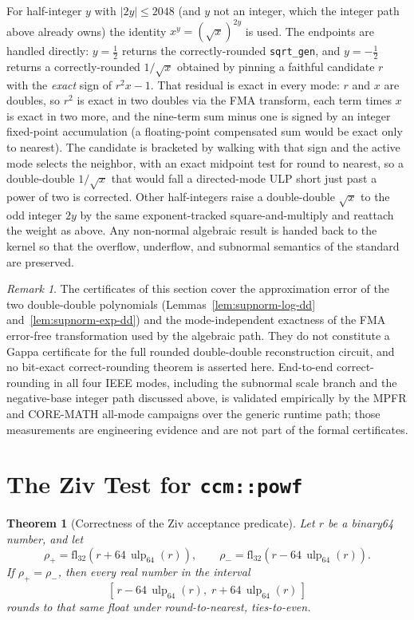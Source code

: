 \documentclass[11pt]{article}
\theoremstyle{plain}
\newtheorem{theorem}{Theorem}
\theoremstyle{remark}
\newtheorem{remark}{Remark}
\newcommand{\ulp}{\operatorname{ulp}}
\newcommand{\Powf}{\texttt{ccm::powf}}
\begin{document}
For half-integer $y$ with $|2y| \le 2048$ (and $y$ not an integer, which the
integer path above already owns) the identity $x^{y} = (\sqrt{x})^{2y}$ is used.
The endpoints are handled directly: $y = \tfrac12$ returns the correctly-rounded
\texttt{sqrt\_gen}, and $y = -\tfrac12$ returns a correctly-rounded $1/\sqrt{x}$
obtained by pinning a faithful candidate $r$ with the \emph{exact} sign of
$r^2 x - 1$.  That residual is exact in every mode: $r$ and $x$ are doubles, so
$r^2$ is exact in two doubles via the FMA transform, each term times $x$ is exact
in two more, and the nine-term sum minus one is signed by an integer
fixed-point accumulation (a floating-point compensated sum would be exact only to
nearest).  The candidate is bracketed by walking with that sign and the active
mode selects the neighbor, with an exact midpoint test for round to nearest, so a
double-double $1/\sqrt{x}$ that would fall a directed-mode ULP short just past a
power of two is corrected.  Other half-integers raise a double-double $\sqrt{x}$
to the odd integer $2y$ by the same exponent-tracked square-and-multiply and
reattach the weight as above.  Any non-normal algebraic result is handed back to
the kernel so that the overflow, underflow, and subnormal semantics of the
standard are preserved.

\begin{remark}
\label{rem:pow-accurate-scope}
The certificates of this section cover the approximation error of the two
double-double polynomials (Lemmas~\ref{lem:supnorm-log-dd}
and~\ref{lem:supnorm-exp-dd}) and the mode-independent exactness of the FMA
error-free transformation used by the algebraic path.  They do not constitute a
Gappa certificate for the full rounded double-double reconstruction circuit, and
no bit-exact correct-rounding theorem is asserted here.  End-to-end
correct-rounding in all four IEEE modes, including the subnormal scale branch and
the negative-base integer path discussed above, is validated empirically by the
MPFR and CORE-MATH all-mode campaigns over the generic runtime path; those
measurements are engineering evidence and are not part of the formal
certificates.
\end{remark}

\section{The Ziv Test for \Powf}
\label{sec:ziv}

\begin{theorem}[Correctness of the Ziv acceptance predicate]
\label{thm:ziv}
Let $r$ be a binary64 number, and let
\[
  \rho_+ = \mathrm{fl}_{32}(r + 64\,\ulp_{64}(r)),
  \qquad
  \rho_- = \mathrm{fl}_{32}(r - 64\,\ulp_{64}(r)).
\]
If $\rho_+ = \rho_-$, then every real number in the interval
\[
  [\,r - 64\,\ulp_{64}(r),\; r + 64\,\ulp_{64}(r)\,]
\]
rounds to that same float under round-to-nearest, ties-to-even.
\end{theorem}
\end{document}

